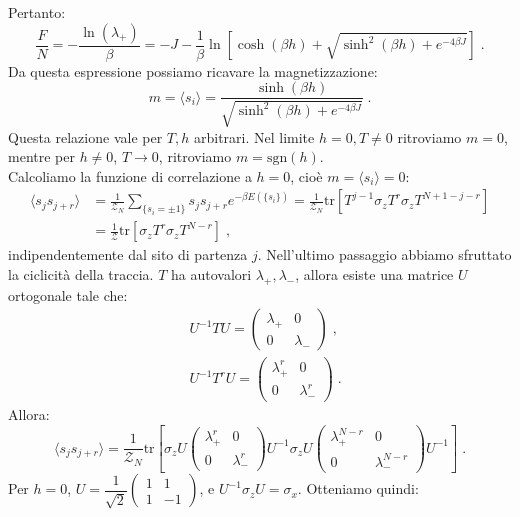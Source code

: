 \documentclass[10pt,a4paper]{report}
\theoremstyle{definition}
\numberwithin{equation}{section}
\newcommand{\bra}{\langle}
\newcommand{\ket}{\rangle}
\newcommand{\tr}{\mathrm{tr}}
\newcommand{\zpart}{\mathcal{Z}}
\begin{document}
Pertanto:
\begin{equation}
\frac{F}{N}=-\frac{\ln(\lambda_+)}{\beta}=-J-\frac{1}{\beta}\ln\left[\cosh(\beta h)+\sqrt{\sinh^2(\beta h)+e^{-4\beta J}}\right]\;.
\end{equation}
Da questa espressione possiamo ricavare la magnetizzazione:
\begin{equation}
m=\bra s_i\ket=\frac{\sinh(\beta h)}{\sqrt{\sinh^2(\beta h)+e^{-4\beta J}}}\;.
\end{equation}
Questa relazione vale per $T,h$ arbitrari. Nel limite $h=0, T\ne 0$ ritroviamo $m=0$, mentre per $h\ne 0$, $T\to 0$, ritroviamo $m=\mathrm{sgn}(h)$. \\
Calcoliamo la funzione di correlazione a $h=0$, cioè $m=\bra s_i\ket=0$:
\begin{align*}
\bra s_js_{j+r}\ket &= \frac{1}{\zpart_N}\sum_{\{s_i=\pm 1\}}s_js_{j+r}e^{-\beta E(\{s_i\})}=\frac{1}{\zpart_N}\tr\left[T^{j-1}\sigma_zT^r\sigma_zT^{N+1-j-r}\right] \\
&= \frac{1}{\zpart}\tr\left[\sigma_zT^r\sigma_zT^{N-r}\right]\;,
\end{align*}
indipendentemente dal sito di partenza $j$. Nell'ultimo passaggio abbiamo sfruttato la ciclicità della traccia. $T$ ha autovalori $\lambda_+,\lambda_-$, allora esiste una matrice $U$ ortogonale tale che:
\begin{align*}
&U^{-1}TU=\left(\begin{matrix}
\lambda_+ & 0 \\
0 & \lambda_-
\end{matrix}\right)\;, \\
&U^{-1}T^rU=\left(\begin{matrix}
\lambda_+^r & 0 \\
0 & \lambda_-^r
\end{matrix}\right)\;.
\end{align*}
Allora:
$$
\bra s_js_{j+r}\ket=\frac{1}{\zpart_N}\tr\left[\sigma_z U\left(\begin{matrix}
\lambda_+^r & 0 \\
0 & \lambda_-^r
\end{matrix}\right)U^{-1}\sigma_zU\left(\begin{matrix}
\lambda_+^{N-r} & 0 \\
0 & \lambda_-^{N-r}
\end{matrix}\right)U^{-1}\right]\;.
$$
Per $h=0$, $U=\dfrac{1}{\sqrt{2}}\left(\begin{matrix}
1 & 1 \\
1 & -1
\end{matrix}\right)$, e $U^{-1}\sigma_zU=\sigma_x$. Otteniamo quindi:
\end{document}
